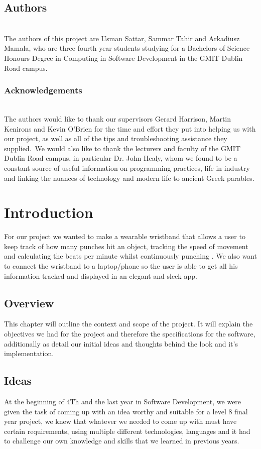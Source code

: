 \documentclass[a4paper,12pt,twoside]{report}
\begin{document}
\section*{Authors}
\\
The authors of this project are Usman Sattar, Sammar Tahir and
Arkadiusz Mamala, who are three fourth year students studying for a
Bachelors of Science Honours Degree in Computing in Software
Development in the GMIT Dublin Road campus.
    
\subsection*{Acknowledgements}
\\
The authors would like to thank our supervisors Gerard Harrison, Martin Kenirons and Kevin O’Brien for the time and effort they put into helping us with our project, as well as all of the tips and troubleshooting assistance they supplied.\ 
We would also like to thank the lecturers and faculty of the GMIT Dublin Road campus, in particular Dr. John Healy, whom we found to be a constant source of useful information on programming practices, life in industry and linking the nuances of technology and modern life to ancient Greek parables.

\body

\chapter{Introduction}
For our project we wanted to make a wearable wristband that allows a user to keep track of how many punches hit an object, tracking the speed of movement and calculating the beats per minute whilst continuously punching . We also want to connect the wristband to a laptop/phone so the user is able to get all his information tracked and displayed in an elegant and sleek app.

\section{Overview}
This chapter will outline the context and scope of the project. It
will explain the objectives we had for the project and therefore the specifications for the software, additionally as detail our initial ideas and thoughts
behind the look and it’s implementation.

\section{Ideas}
At the beginning of 4Th and the last year in Software Development, we were given the task of coming up with an idea worthy and suitable for a level 8 final year project, we knew that whatever we needed to come up with must have certain requirements, using multiple different technologies, languages and it had to challenge our own knowledge and skills that we learned in previous years.
\end{document}
